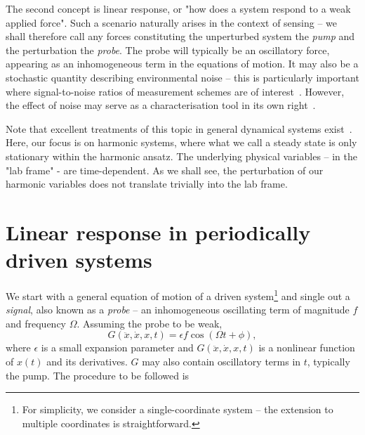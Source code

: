The second concept is linear response, or "how does a system respond to a weak applied force". Such a scenario naturally arises in the context of sensing -- we shall therefore call any forces constituting the unperturbed system the \textit{pump} and the perturbation the \textit{probe}. The probe will typically be an oscillatory force, appearing as an inhomogeneous term in the equations of motion. It may also be a stochastic quantity describing environmental noise -- this is particularly important where signal-to-noise ratios of measurement schemes are of interest~\cite{Heugel_2019, Cleland_2005}. However, the effect of noise may serve as a characterisation tool in its own right~\cite{Yang_2021b, Huber_2020}.

Note that excellent treatments of this topic in general dynamical systems exist~\cite{Jordan_Smith, Guckenheimer_Holmes, Rand_2005}. Here, our focus is on harmonic systems, where what we call a steady state is only stationary within the harmonic ansatz. The underlying physical variables -- in the "lab frame" - are time-dependent. As we shall see, the perturbation of our harmonic variables does not translate trivially into the lab frame.  

\section{Linear response in periodically driven systems} \label{sec:linresp}

We start with a general equation of motion of a driven system\footnote{For simplicity, we consider a single-coordinate system -- the extension to multiple coordinates is straightforward.} and single out a \textit{signal}, also known as a \textit{probe} -- an inhomogeneous oscillating term of magnitude $f$ and frequency $\Omega$. Assuming the probe to be weak,
\begin{equation} \label{eq:linresp_origeom}
G(\ddot{x}, \dot{x}, x, t ) = \epsilon f\cos(\Omega  t + \phi ),
\end{equation}
where $\epsilon$ is a small expansion parameter and $G(\ddot{x}, \dot{x}, x, t )$ is a nonlinear function of $x(t)$ and its derivatives. $G$ may also contain oscillatory terms in $t$, typically the pump. The procedure to be followed is

